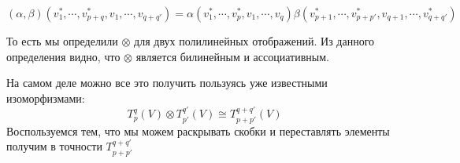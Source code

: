 $$(\alpha, \beta) (v_1^*, \cdots, v_{p + q}^*, v_1, \cdots, v_{q + q'}) = \alpha(v_1^*, \cdots, v_p^*, v_1, \cdots, v_q)\beta(v_{p + 1}^*, \cdots, v_{p + p'}^*, v_{q + 1}, \cdots, v^*_{q + q'})$$

То есть мы определили $\otimes$ для двух полилинейных отображений. Из данного
определения видно, что $\otimes$ является билинейным и ассоциативным.

На самом деле можно все это получить пользуясь уже известными изоморфизмами:
    $$T_{p}^q(V) \otimes T_{p'}^{q'}(V) \cong T_{p + p'}^{q + q'}(V)$$
    Воспользуемся тем, что мы можем раскрывать скобки и переставлять элементы получим в точности $T_{p + p'}^{q + q'}$
   
